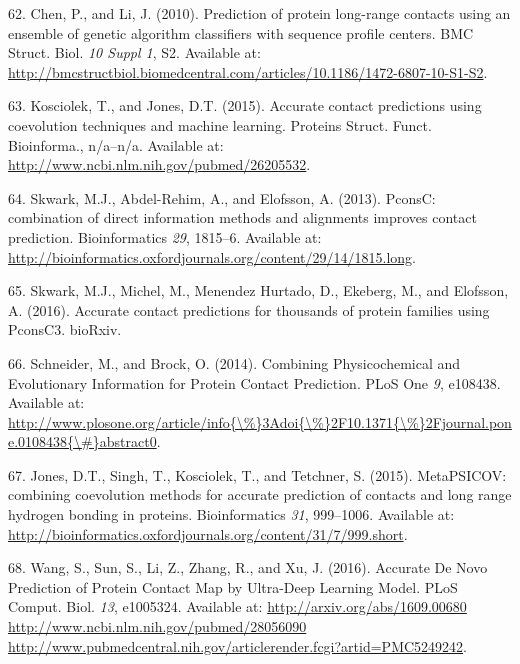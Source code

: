 \documentclass[12pt,a4paper,twoside]{book}
\theoremstyle{definition}
\theoremstyle{definition}
\theoremstyle{remark}
\begin{document}
\hypertarget{ref-Chen2010}{}
62. Chen, P., and Li, J. (2010). Prediction of protein long-range
contacts using an ensemble of genetic algorithm classifiers with
sequence profile centers. BMC Struct. Biol. \emph{10 Suppl 1}, S2.
Available at:
\url{http://bmcstructbiol.biomedcentral.com/articles/10.1186/1472-6807-10-S1-S2}.

\hypertarget{ref-Kosciolek2015a}{}
63. Kosciolek, T., and Jones, D.T. (2015). Accurate contact predictions
using coevolution techniques and machine learning. Proteins Struct.
Funct. Bioinforma., n/a--n/a. Available at:
\url{http://www.ncbi.nlm.nih.gov/pubmed/26205532}.

\hypertarget{ref-Skwark2013}{}
64. Skwark, M.J., Abdel-Rehim, A., and Elofsson, A. (2013). PconsC:
combination of direct information methods and alignments improves
contact prediction. Bioinformatics \emph{29}, 1815--6. Available at:
\url{http://bioinformatics.oxfordjournals.org/content/29/14/1815.long}.

\hypertarget{ref-Skwark2016}{}
65. Skwark, M.J., Michel, M., Menendez Hurtado, D., Ekeberg, M., and
Elofsson, A. (2016). Accurate contact predictions for thousands of
protein families using PconsC3. bioRxiv.

\hypertarget{ref-Schneider2014}{}
66. Schneider, M., and Brock, O. (2014). Combining Physicochemical and
Evolutionary Information for Protein Contact Prediction. PLoS One
\emph{9}, e108438. Available at:
\href{http://www.plosone.org/article/info\%7B/\%\%7D3Adoi\%7B/\%\%7D2F10.1371\%7B/\%\%7D2Fjournal.pone.0108438\%7B/\#\%7Dabstract0}{http://www.plosone.org/article/info\{\textbackslash{}\%\}3Adoi\{\textbackslash{}\%\}2F10.1371\{\textbackslash{}\%\}2Fjournal.pone.0108438\{\textbackslash{}\#\}abstract0}.

\hypertarget{ref-Jones2015a}{}
67. Jones, D.T., Singh, T., Kosciolek, T., and Tetchner, S. (2015).
MetaPSICOV: combining coevolution methods for accurate prediction of
contacts and long range hydrogen bonding in proteins. Bioinformatics
\emph{31}, 999--1006. Available at:
\url{http://bioinformatics.oxfordjournals.org/content/31/7/999.short}.

\hypertarget{ref-Wang2016a}{}
68. Wang, S., Sun, S., Li, Z., Zhang, R., and Xu, J. (2016). Accurate De
Novo Prediction of Protein Contact Map by Ultra-Deep Learning Model.
PLoS Comput. Biol. \emph{13}, e1005324. Available at:
\href{http://arxiv.org/abs/1609.00680\%20http://www.ncbi.nlm.nih.gov/pubmed/28056090\%20http://www.pubmedcentral.nih.gov/articlerender.fcgi?artid=PMC5249242}{http://arxiv.org/abs/1609.00680 http://www.ncbi.nlm.nih.gov/pubmed/28056090 http://www.pubmedcentral.nih.gov/articlerender.fcgi?artid=PMC5249242}.
\end{document}
